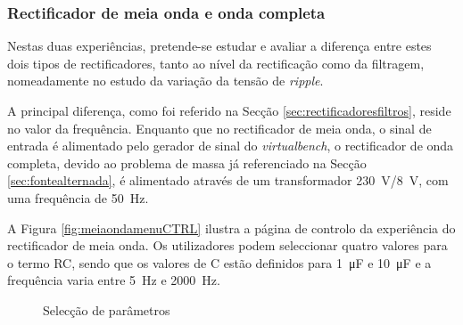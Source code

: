 \subsubsection{Rectificador de meia onda e onda completa}
\label{sec:rectificadores}
Nestas duas experiências, pretende-se estudar e avaliar a diferença entre estes dois tipos de rectificadores, tanto ao nível da rectificação como da filtragem, nomeadamente no estudo da variação da tensão de \textit{ripple}.

A principal diferença, como foi referido na Secção \ref{sec:rectificadoresfiltros}, reside no valor da frequência. Enquanto que no rectificador de meia onda, o sinal de entrada é alimentado pelo gerador de sinal do \textit{virtualbench}, o rectificador de onda completa, devido ao problema de massa já referenciado na Secção \ref{sec:fontealternada}, é alimentado através de um transformador \SI{230}{\volt}/\SI{8}{\volt}, com uma frequência de \SI{50}{\hertz}.

A Figura \ref{fig:meiaondamenuCTRL} ilustra a página de controlo da experiência do rectificador de meia onda. Os utilizadores podem seleccionar quatro valores para o termo RC, sendo que os valores de C estão definidos para \SI{1}{\micro\farad} e \SI{10}{\micro\farad} e a frequência varia entre \SI{5}{\hertz} e \SI{2000}{\hertz}. 

\begin{figure}[hbtp]
	\centering%
		\centering
		\qquad
		\caption{Selecção de parâmetros}%
		\label{fig:seleccaoparametros}%
\end{figure}

